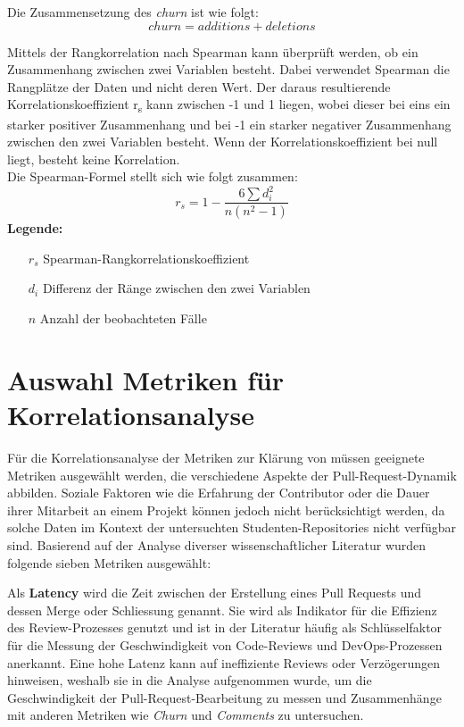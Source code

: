 Die Zusammensetzung des \textit{churn} ist wie folgt:
\begin{equation}
churn = additions + deletions
\end{equation}

Mittels der Rangkorrelation nach Spearman \parencite{noauthor_t-test_nodate} kann überprüft werden, ob ein Zusammenhang zwischen zwei Variablen besteht. Dabei verwendet Spearman die Rangplätze der Daten und nicht deren Wert. Der daraus resultierende Korrelationskoeffizient r\textsubscript{s} kann zwischen -1 und 1 liegen, wobei dieser bei eins ein starker positiver Zusammenhang und bei -1 ein starker negativer Zusammenhang zwischen den zwei Variablen besteht. Wenn der Korrelationskoeffizient bei null liegt, besteht keine Korrelation. \parencite{noauthor_t-test_nodate}  \\
Die Spearman-Formel \parencite{noauthor_t-test_nodate} stellt sich wie folgt zusammen: 
\begin{equation}
r_s = 1 - \frac{6 \sum d_i^2}{n(n^2 - 1)}
\end{equation}
\label{eqn:spearman}
\noindent\textbf{Legende:}
\begin{itemize}
  \item [$r_s$] Spearman-Rangkorrelationskoeffizient
  \item[$d_i$] Differenz der Ränge zwischen den zwei Variablen 
  \item[$n$] Anzahl der beobachteten Fälle
\end{itemize}


\section{Auswahl Metriken für Korrelationsanalyse}
\label{sec:MetrikenKorrelation}
Für die Korrelationsanalyse der Metriken zur Klärung von  müssen geeignete Metriken ausgewählt werden, die verschiedene Aspekte der Pull-Request-Dynamik abbilden. Soziale Faktoren wie die Erfahrung der Contributor oder die Dauer ihrer Mitarbeit an einem Projekt können jedoch nicht berücksichtigt werden, da solche Daten im Kontext der untersuchten Studenten-Repositories nicht verfügbar sind. Basierend auf der Analyse diverser wissenschaftlicher Literatur wurden folgende sieben Metriken ausgewählt:

Als \textbf{Latency} wird die Zeit zwischen der Erstellung eines Pull Requests und dessen Merge oder Schliessung genannt. Sie wird als Indikator für die Effizienz des Review-Prozesses genutzt und ist in der Literatur häufig als Schlüsselfaktor für die Messung der Geschwindigkeit von Code-Reviews und DevOps-Prozessen anerkannt. Eine hohe Latenz kann auf ineffiziente Reviews oder Verzögerungen hinweisen, weshalb sie in die Analyse aufgenommen wurde, um die Geschwindigkeit der Pull-Request-Bearbeitung zu messen und Zusammenhänge mit anderen Metriken wie \textit{Churn} und \textit{Comments} zu untersuchen. \parencite{yu_wait_2015}

